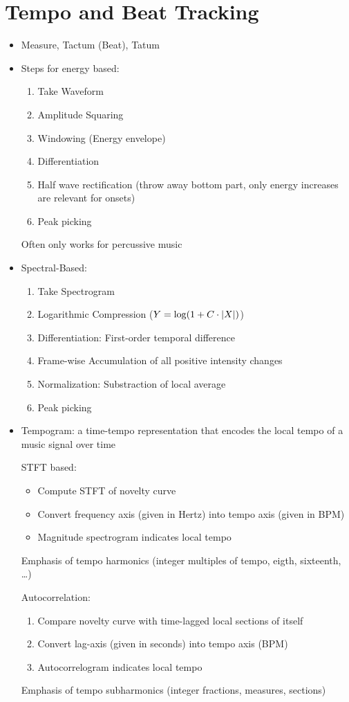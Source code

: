 \section{Tempo and Beat Tracking}
\begin{itemize}
	\item
		Measure, Tactum (Beat), Tatum
	\item
		Steps for energy based:
		\begin{enumerate}
			\item
				Take Waveform
			\item
				Amplitude Squaring
			\item
				Windowing (Energy envelope)
			\item
				Differentiation
			\item
				Half wave rectification (throw away bottom part, only energy increases are relevant for onsets)
			\item
				Peak picking
		\end{enumerate}
		Often only works for percussive music
	\item
		Spectral-Based:
		\begin{enumerate}
			\item
				Take Spectrogram
			\item
				Logarithmic Compression ($Y = \log(1+C\cdot \lvert X\rvert)$)
			\item
				Differentiation: First-order temporal difference
			\item
				Frame-wise Accumulation  of all positive intensity changes
			\item
				Normalization: Substraction of local average
			\item
				Peak picking
		\end{enumerate}
	\item
		Tempogram: a time-tempo representation that encodes the local tempo of a music signal over time

		STFT based:
		\begin{itemize}
			\item
				Compute STFT of novelty curve
			\item
				Convert frequency axis (given in Hertz) into tempo axis (given in BPM)
			\item
				Magnitude spectrogram indicates local tempo
		\end{itemize}
		Emphasis of tempo harmonics (integer multiples of tempo, eigth, sixteenth, \dots)

		Autocorrelation:
		\begin{enumerate}
			\item
				Compare novelty curve with time-lagged local sections of itself
			\item
				Convert lag-axis (given in seconds) into tempo axis (BPM)
			\item
				Autocorrelogram indicates local tempo
		\end{enumerate}
		Emphasis of tempo subharmonics (integer fractions, measures, sections)
\end{itemize}

